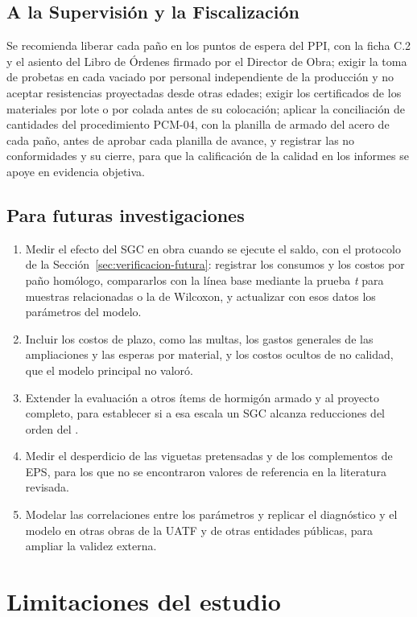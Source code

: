 \subsection{A la Supervisión y la Fiscalización}
Se recomienda liberar cada paño en los puntos de espera del PPI, con la ficha C.2 y el asiento del Libro de Órdenes firmado por el Director de Obra; exigir la toma de probetas en cada vaciado por personal independiente de la producción y no aceptar resistencias proyectadas desde otras edades; exigir los certificados de los materiales por lote o por colada antes de su colocación; aplicar la conciliación de cantidades del procedimiento PCM-04, con la planilla de armado del acero de cada paño, antes de aprobar cada planilla de avance, y registrar las no conformidades y su cierre, para que la calificación de la calidad en los informes se apoye en evidencia objetiva.

\subsection{Para futuras investigaciones}
\begin{enumerate}[label=(\arabic*)]
  \item Medir el efecto del SGC en obra cuando se ejecute el saldo, con el protocolo de la Sección~\ref{sec:verificacion-futura}: registrar los consumos y los costos por paño homólogo, compararlos con la línea base mediante la prueba \emph{t} para muestras relacionadas o la de Wilcoxon, y actualizar con esos datos los parámetros del modelo.
  \item Incluir los costos de plazo, como las multas, los gastos generales de las ampliaciones y las esperas por material, y los costos ocultos de no calidad, que el modelo principal no valoró.
  \item Extender la evaluación a otros ítems de hormigón armado y al proyecto completo, para establecer si a esa escala un SGC alcanza reducciones del orden del \MCumbral{}.
  \item Medir el desperdicio de las viguetas pretensadas y de los complementos de EPS, para los que no se encontraron valores de referencia en la literatura revisada.
  \item Modelar las correlaciones entre los parámetros y replicar el diagnóstico y el modelo en otras obras de la UATF y de otras entidades públicas, para ampliar la validez externa.
\end{enumerate}

\section{Limitaciones del estudio}

